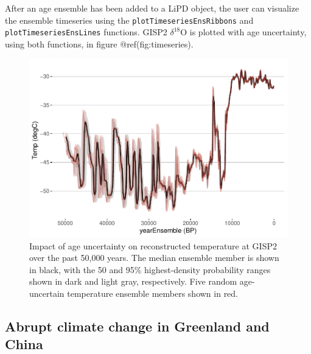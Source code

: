\documentclass[gchron, manuscript]{copernicus}
\begin{document}
After an age ensemble has been added to a LiPD object, the user can
visualize the ensemble timeseries using the
\newline \texttt{plotTimeseriesEnsRibbons} and
\texttt{plotTimeseriesEnsLines} functions. GISP2 \(\delta^{18}\)O is
plotted with age uncertainty, using both functions, in figure
@ref(fig:timeseries).

\begin{figure}
\includegraphics[width=12cm]{geoChronR-paper_files/figure-latex/timeseries-1} \caption{Impact of age uncertainty on reconstructed temperature at GISP2 over the past 50,000 years. The median ensemble member is shown in black, with the 50 and 95\% highest-density probability ranges shown in dark and light gray, respectively. Five random age-uncertain temperature ensemble members shown in red.}\label{fig:timeseries}
\end{figure}

\subsection{Abrupt climate change in Greenland and China}
\end{document}
